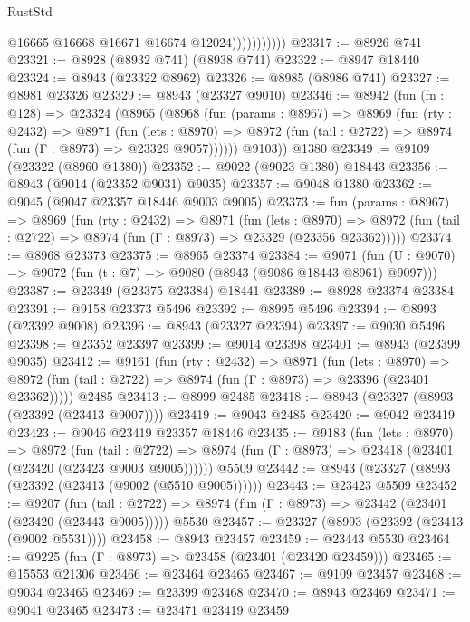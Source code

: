 \begin{lexlean}{RustStd}
\begin{coremodule}
                          @16665
                          @16668
                          @16671
                          @16674
                          @12024)))))))))))
@23317 := @8926 @741
@23321 := @8928 (@8932 @741) (@8938 @741)
@23322 := @8947 @18440
@23324 := @8943 (@23322 @8962)
@23326 := @8985 (@8986 @741)
@23327 := @8981 @23326
@23329 := @8943 (@23327 @9010)
@23346 := @8942
    (fun (fn : @128) =>
    @23324
      (@8965
        (@8968
          (fun (params : @8967) =>
          @8969
            (fun (rty : @2432) =>
            @8971
              (fun (lets : @8970) =>
              @8972 (fun (tail : @2722) => @8974 (fun (Γ : @8973) => @23329 @9057))))))
        @9103))
    @1380
@23349 := @9109 (@23322 (@8960 @1380))
@23352 := @9022 (@9023 @1380) @18443
@23356 := @8943 (@9014 (@23352 @9031) @9035)
@23357 := @9048 @1380
@23362 := @9045 (@9047 @23357 @18446 @9003 @9005)
@23373 := fun (params : @8967) =>
  @8969
    (fun (rty : @2432) =>
    @8971
      (fun (lets : @8970) =>
      @8972 (fun (tail : @2722) => @8974 (fun (Γ : @8973) => @23329 (@23356 @23362)))))
@23374 := @8968 @23373
@23375 := @8965 @23374
@23384 := @9071
    (fun (U : @9070) => @9072 (fun (t : @7) => @9080 (@8943 (@9086 @18443 @8961) @9097)))
@23387 := @23349 (@23375 @23384) @18441
@23389 := @8928 @23374 @23384
@23391 := @9158 @23373 @5496
@23392 := @8995 @5496
@23394 := @8993 (@23392 @9008)
@23396 := @8943 (@23327 @23394)
@23397 := @9030 @5496
@23398 := @23352 @23397
@23399 := @9014 @23398
@23401 := @8943 (@23399 @9035)
@23412 := @9161
    (fun (rty : @2432) =>
    @8971
      (fun (lets : @8970) =>
      @8972 (fun (tail : @2722) => @8974 (fun (Γ : @8973) => @23396 (@23401 @23362)))))
    @2485
@23413 := @8999 @2485
@23418 := @8943 (@23327 (@8993 (@23392 (@23413 @9007))))
@23419 := @9043 @2485
@23420 := @9042 @23419
@23423 := @9046 @23419 @23357 @18446
@23435 := @9183
    (fun (lets : @8970) =>
    @8972
      (fun (tail : @2722) =>
      @8974 (fun (Γ : @8973) => @23418 (@23401 (@23420 (@23423 @9003 @9005))))))
    @5509
@23442 := @8943 (@23327 (@8993 (@23392 (@23413 (@9002 (@5510 @9005))))))
@23443 := @23423 @5509
@23452 := @9207
    (fun (tail : @2722) => @8974 (fun (Γ : @8973) => @23442 (@23401 (@23420 (@23443 @9005)))))
    @5530
@23457 := @23327 (@8993 (@23392 (@23413 (@9002 @5531))))
@23458 := @8943 @23457
@23459 := @23443 @5530
@23464 := @9225 (fun (Γ : @8973) => @23458 (@23401 (@23420 @23459)))
@23465 := @15553 @21306
@23466 := @23464 @23465
@23467 := @9109 @23457
@23468 := @9034 @23465
@23469 := @23399 @23468
@23470 := @8943 @23469
@23471 := @9041 @23465
@23473 := @23471 @23419 @23459

\end{coremodule}
\end{lexlean}
